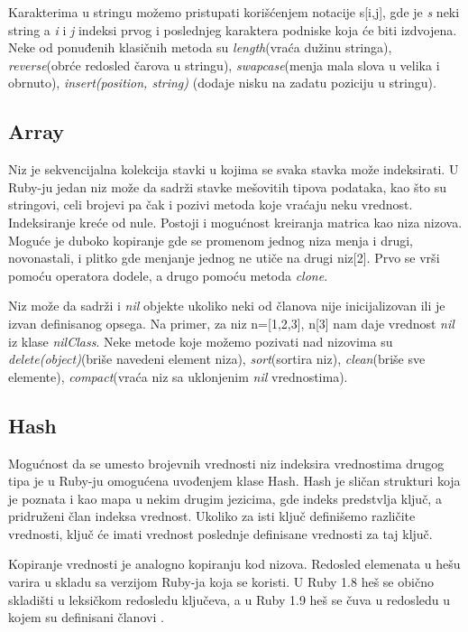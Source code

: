 \documentclass[a4paper]{article}
\begin{document}
Karakterima u stringu možemo pristupati korišćenjem notacije s[i,j], gde je \emph{s} neki string a \emph{i} i \emph{j} indeksi prvog i poslednjeg karaktera podniske koja će biti izdvojena. Neke od ponuđenih klasičnih metoda su \emph{length}(vraća dužinu stringa), \emph{reverse}(obrće redosled čarova u stringu), \emph{swapcase}(menja mala slova u velika i obrnuto), \emph{insert(position, string)} (dodaje nisku na zadatu poziciju u stringu).

\subsection{Array}
Niz je sekvencijalna kolekcija stavki u kojima se svaka stavka može indeksirati. U Ruby-ju jedan niz može da sadrži stavke mešovitih tipova podataka, kao što su stringovi, celi brojevi pa čak i pozivi metoda koje vraćaju neku vrednost. Indeksiranje kreće od nule. Postoji i mogućnost kreiranja matrica kao niza nizova. Moguće je duboko kopiranje gde se promenom jednog niza menja i drugi, novonastali, i plitko gde menjanje jednog ne utiče na drugi niz[2]. Prvo se vrši pomoću operatora dodele, a drugo pomoću metoda \emph{clone}. 

Niz može da sadrži i \emph{nil} objekte ukoliko neki od članova nije inicijalizovan ili je izvan definisanog opsega. Na primer, za niz n=[1,2,3], n[3]  nam daje vrednost \emph{nil} iz klase \emph{nilClass}. Neke metode koje možemo pozivati nad nizovima su \emph{delete(object)}(briše navedeni element niza), \emph{sort}(sortira niz), \emph{clean}(briše sve elemente), \emph{compact}(vraća niz sa uklonjenim \emph{nil} vrednostima).

\subsection{Hash}
Mogućnost da se umesto brojevnih vrednosti niz indeksira vrednostima drugog tipa je u Ruby-ju omogućena uvođenjem klase Hash. Hash je sličan strukturi koja je poznata i kao mapa u nekim drugim jezicima, gde indeks predstvlja ključ, a pridruženi član indeksa vrednost. Ukoliko za isti ključ definišemo različite vrednosti, ključ  će imati vrednost poslednje definisane vrednosti za taj ključ. 

Kopiranje vrednosti je analogno kopiranju kod nizova. Redosled elemenata u hešu varira u skladu sa verzijom Ruby-ja koja se koristi. U Ruby 1.8 heš se obično skladišti u leksičkom redosledu ključeva, a u Ruby 1.9 heš se čuva u redosledu u kojem su definisani članovi \cite{HandsOn}.
\end{document}

